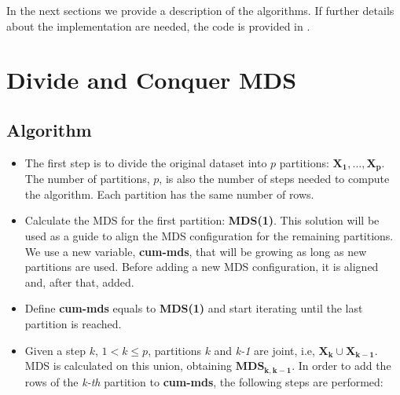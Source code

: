 \documentclass[11pt]{report}
\begin{document}
In the next sections we provide a description of the algorithms. 
If further details about the implementation are needed, the code is provided in 
.

\section{Divide and Conquer MDS}
\subsection{Algorithm}

\begin{itemize}

\item The first step is to divide the original dataset into $p$ partitions: 
$\mathbf{X_1},\dots, \mathbf{X_p}$. The number of partitions, $p$, is also
the number of steps needed to compute the algorithm. Each partition has the
same number of rows.

\item Calculate the MDS for the first partition: \textbf{MDS(1)}. This solution
will be used as a guide to align the MDS configuration for the remaining 
partitions. We use a new variable, \textbf{cum-mds}, that will be growing 
as long as new partitions are used. Before adding a new MDS configuration, 
it is aligned and, after that, added. 

\item Define \textbf{cum-mds} equals to \textbf{MDS(1)} and start iterating 
until the last partition is reached.

\item Given a step $k$, $1 < k \leq p$, partitions $k$ and \textit{k-1} are 
joint, i.e, $\mathbf{X_k} \cup \mathbf{X_{k-1}}$. MDS is calculated on 
this union, obtaining $\mathbf{MDS_{k, k-1}}$. In order to add the
rows of the \textit{k-th} partition to \textbf{cum-mds}, the following steps 
are performed:


\end{itemize}
\end{document}
